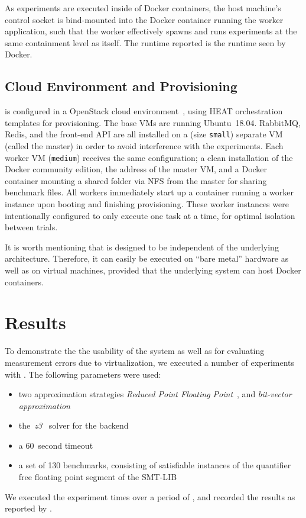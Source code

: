 \documentclass[a4paper]{IEEEtran}
\begin{document}
As experiments are executed inside of Docker containers, the host machine's
control socket is bind-mounted into the Docker container running the worker
application, such that the worker effectively spawns and runs experiments at the
same containment level as itself. The runtime reported is the runtime seen by
Docker.

\subsection{Cloud Environment and Provisioning}

\testbench{} is configured in a OpenStack cloud environment~\cite{openstack},
using HEAT orchestration templates for provisioning. The base VMs are running
Ubuntu~18.04. RabbitMQ, Redis, and the front-end API are all installed
on a (size \texttt{small}) separate VM (called the master) in order to avoid
interference with the experiments. Each worker VM (\texttt{medium}) receives the
same configuration; a clean installation of the Docker community edition, the
address of the master VM, and a Docker container mounting a shared folder via
NFS from the master for sharing benchmark files. All workers immediately start
up a container running a worker instance upon booting and finishing
provisioning. These worker instances were intentionally configured to only
execute one task at a time, for optimal isolation between trials.

It is worth mentioning that \testbench{} is designed to be independent of the
underlying architecture. Therefore, it can easily be executed on ``bare metal''
hardware as well as on virtual machines, provided that the underlying system can
host Docker containers.

\section{Results}
To demonstrate the the usability of the system as well as for evaluating
measurement errors due to virtualization, we executed a number of experiments
with \testbench{}. The following parameters were used:
\begin{itemize}
\item two approximation strategies \emph{Reduced Point
  Floating Point}~\cite{uppsat}, and \emph{bit-vector
  approximation}~\cite{joel}

\item the~\emph{z3}~\cite{z3} solver for the backend

\item a 60~second timeout

\item a set of 130 benchmarks, consisting of satisfiable instances of the
  quantifier free floating point segment of the SMT-LIB~\cite{smtlib}
\end{itemize}
We executed the experiment  times over a period of
, and recorded the results as reported by \testbench{}.
\end{document}
